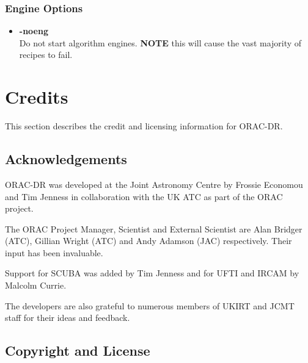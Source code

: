 \documentclass[twoside,11pt]{article}
\newcommand{\underscore}{\leavevmode\kern.04em\vbox{\hrule width 0.4em height 0.3pt}}
\newcommand{\xlabel}[1]{}
\renewcommand{\_}{\texttt{\symbol{95}}}
\begin{document}
\subsubsection*{Engine Options}%

\begin{itemize}

\item{\bf -noeng}%
%
\hfil\\
Do not start algorithm engines. {\bf NOTE} this will cause
the vast majority of recipes to fail.

\end{itemize}



\section{Credits\xlabel{credits}}%

This section describes the credit and licensing information for ORAC-DR.

\subsection*{Acknowledgements}%

ORAC-DR was developed at the Joint Astronomy Centre by
Frossie Economou and Tim Jenness in collaboration with the
UK ATC as part of the ORAC project.

The ORAC Project Manager, Scientist and External Scientist
are Alan Bridger (ATC), Gillian Wright (ATC) and Andy
Adamson (JAC) respectively. Their input has been invaluable.

Support for SCUBA was added by Tim Jenness
and for UFTI and IRCAM by Malcolm Currie.

The developers are also grateful to numerous members of
UKIRT and JCMT staff for their ideas and feedback.

\subsection*{Copyright and License}%
\end{document}

